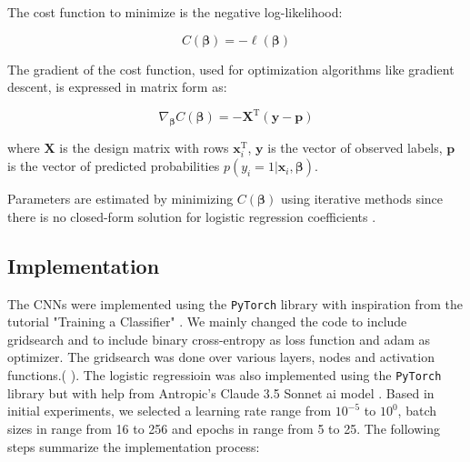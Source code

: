 The cost function to minimize is the negative log-likelihood:

\begin{equation}
    C(\boldsymbol{\beta}) = -\ell(\boldsymbol{\beta})
\end{equation}

The gradient of the cost function, used for optimization algorithms like gradient descent, is expressed in matrix form as:

\begin{equation}
    \nabla_{\boldsymbol{\beta}} C(\boldsymbol{\beta}) = -\mathbf{X}^\mathrm{T} (\boldsymbol{y} - \boldsymbol{p})
\end{equation}

where $\mathbf{X}$ is the design matrix with rows $\boldsymbol{x}_i^\mathrm{T}$,
 $\boldsymbol{y}$ is the vector of observed labels,
 $\boldsymbol{p}$ is the vector of predicted probabilities $p(y_i = 1 \vert \boldsymbol{x}_i, \boldsymbol{\beta})$.

Parameters are estimated by minimizing $C(\boldsymbol{\beta})$ using iterative methods since there is no closed-form solution for logistic regression coefficients \cite{Hjorth-Jensen_MachineLearning_2023}.


\subsection{Implementation}

The CNNs were implemented using the \texttt{PyTorch} library \cite{Paszke2019} with inspiration from the tutorial "Training a Classifier" \cite{pytorch_cifar10_tutorial}. We mainly changed the code to include gridsearch and to include binary cross-entropy as loss function and adam as optimizer. The gridsearch was done over various layers, nodes and activation functions.( ). The logistic regressioin was also implemented using the \texttt{PyTorch} library but with help from Antropic's Claude 3.5 Sonnet ai model \cite{anthropic_claude_3_5_sonnet}. Based in initial experiments, we selected a learning rate range from \( 10^{-5}\) to \( 10^0 \), batch sizes in range from 16 to 256 and epochs in range from 5 to 25. The following steps summarize the implementation process:

